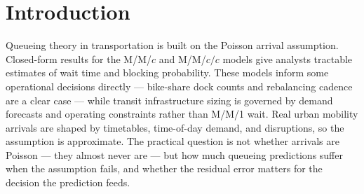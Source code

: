 
\begin{abstract}
\noindent We test how two Boston mobility systems depart from Poisson arrival assumptions and quantify the resulting error in queueing predictions. Using four months of data from Bluebikes at Kendall/MIT and MIT Vassar~St (user-driven, finite-capacity) and the MBTA Red Line at Kendall/MIT (schedule-driven), we reject exponential inter-arrival times for every system ($p \approx 0$ under Kolmogorov--Smirnov, Anderson--Darling, and $\chi^2$) but in opposite directions: Bluebikes is overdispersed ($\mathrm{CV} = 1.75$--$1.90$, best fit Weibull) and MBTA is underdispersed ($\mathrm{CV} = 0.63$--$0.71$, best fit log-normal). Analytical Poisson queueing underestimates Bluebikes wait by roughly an order of magnitude and Erlang~B blocking at Kendall/MIT by 55-fold, while overestimating MBTA wait by 5--12$\times$. Best-fit Weibull/log-normal IATs reproduce $W_q$ to within a second but close only about a seventh of the $55\times$ blocking gap: the marginal IAT distribution is sufficient for wait but not for blocking, and the residual is consistent with non-stationarity in $\lambda(t)$ and/or $\mu(t)$ that stationary arrival-process correction alone cannot address.
\end{abstract}

\section{Introduction}\label{sec:intro}

Queueing theory in transportation is built on the Poisson arrival assumption. Closed-form results for the M/M/$c$ and M/M/$c/c$ models \cite{kleinrock1975,erlang1917} give analysts tractable estimates of wait time and blocking probability. These models inform some operational decisions directly --- bike-share dock counts and rebalancing cadence are a clear case --- while transit infrastructure sizing is governed by demand forecasts and operating constraints rather than M/M/1 wait. Real urban mobility arrivals are shaped by timetables, time-of-day demand, and disruptions, so the assumption is approximate. The practical question is not whether arrivals are Poisson --- they almost never are --- but how much queueing predictions suffer when the assumption fails, and whether the residual error matters for the decision the prediction feeds.

